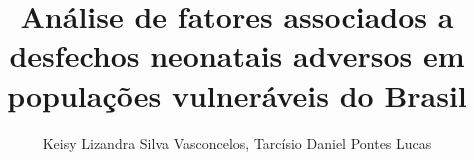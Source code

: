 
\title{Análise de fatores associados a desfechos neonatais adversos em
populações vulneráveis do Brasil}

\author{Keisy Lizandra Silva Vasconcelos, Tarcísio Daniel Pontes Lucas}

\address{Universidade de Pernambuco (UPE) -- Campus Caruaru\\
  Caruaru -- PE -- Brasil
}

